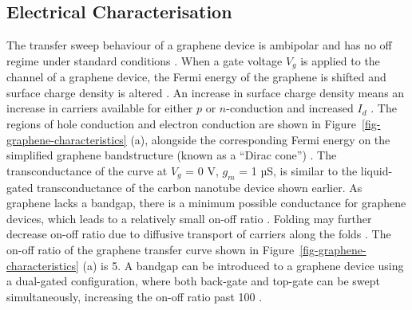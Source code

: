 \documentclass[
  a4paper,
]{scrbook}
\begin{document}
\hypertarget{sec-electrical-characterisation-graphene}{%
\subsection{Electrical
Characterisation}\label{sec-electrical-characterisation-graphene}}

The transfer sweep behaviour of a graphene device is ambipolar and has
no off regime under standard conditions
\autocite{Novoselov2004,Bartolomeo2011,Ohno2015}. When a gate voltage
\(V_g\) is applied to the channel of a graphene device, the Fermi energy
of the graphene is shifted and surface charge density is altered
\autocite{Novoselov2004,Heller2010,Ohno2015}. An increase in surface
charge density means an increase in carriers available for either \(p\)
or \(n\)-conduction and increased \(I_d\) \autocite{Geim2007}. The
regions of hole conduction and electron conduction are shown in
Figure~\ref{fig-graphene-characteristics} (a), alongside the
corresponding Fermi energy on the simplified graphene bandstructure
(known as a ``Dirac cone'') \autocite{Geim2007,Ohno2015}. The
transconductance of the curve at \(V_g\) = 0 V, \(g_m\) = 1 µS, is
similar to the liquid-gated transconductance of the carbon nanotube
device shown earlier. As graphene lacks a bandgap, there is a minimum
possible conductance for graphene devices, which leads to a relatively
small on-off ratio \autocite{Novoselov2004,Geim2007}. Folding may
further decrease on-off ratio due to diffusive transport of carriers
along the folds \autocite{Zhu2012}. The on-off ratio of the graphene
transfer curve shown in Figure~\ref{fig-graphene-characteristics} (a) is
5. A bandgap can be introduced to a graphene device using a dual-gated
configuration, where both back-gate and top-gate can be swept
simultaneously, increasing the on-off ratio past 100
\autocite{Xia2010,Ahn2020,Shkodra2021}.
\end{document}
